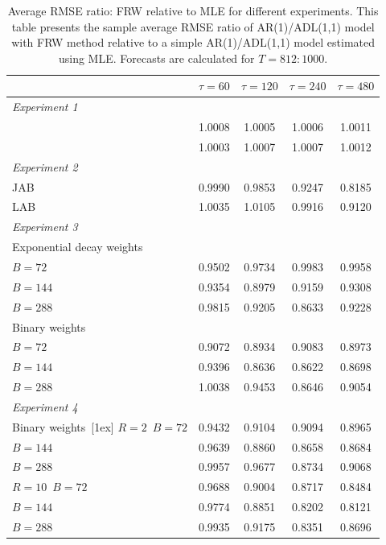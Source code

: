 \begin{table}[ht!]\centering
\begin{tabular}{l c c c c}
\toprule
  &  $\tau=60$     &    $\tau=120$     &   $\tau=240$ &   $\tau=480$  \\
\toprule
\textit{Experiment 1}\\
        & 1.0008 & 1.0005 & 1.0006 & 1.0011\\
        & 1.0003 & 1.0007 & 1.0007 & 1.0012\\[1ex]
\textit{Experiment 2}\\
JAB  & 0.9990 & 0.9853 & 0.9247 & 0.8185\\
LAB  & 1.0035 & 1.0105 & 0.9916 & 0.9120\\[1ex]
\textit{Experiment 3}\\
Exponential decay weights\\
$B=72$  & 0.9502 & 0.9734 & 0.9983 & 0.9958\\
$B=144$  & 0.9354 & 0.8979 & 0.9159 & 0.9308\\
$B=288$  & 0.9815 & 0.9205 & 0.8633 & 0.9228\\[1ex]
Binary weights\\
$B=72$  & 0.9072 & 0.8934 & 0.9083 & 0.8973\\
$B=144$  & 0.9396 & 0.8636 & 0.8622 & 0.8698\\
$B=288$  & 1.0038 & 0.9453 & 0.8646 & 0.9054\\[1ex]
\textit{Experiment 4 }\\
Binary weights\    [1ex]
$R=2$\
$B=72$  & 0.9432 & 0.9104 & 0.9094 & 0.8965\\
$B=144$  & 0.9639 & 0.8860 & 0.8658 & 0.8684\\
$B=288$  & 0.9957 & 0.9677 & 0.8734 & 0.9068\\[2ex]
$R=10$\
$B=72$  & 0.9688 & 0.9004 & 0.8717 & 0.8484\\
$B=144$  & 0.9774 & 0.8851 & 0.8202 & 0.8121\\
$B=288$  & 0.9935 & 0.9175 & 0.8351 & 0.8696\\
\toprule
\end{tabular}
\caption{Average RMSE ratio: FRW relative to MLE for different experiments. \small{This table presents the sample average RMSE ratio of AR(1)/ADL(1,1) model with FRW method relative to a simple AR(1)/ADL(1,1) model estimated using MLE. Forecasts are calculated for $T=812:1000$. } }\label{tab:E5}
\end{table}